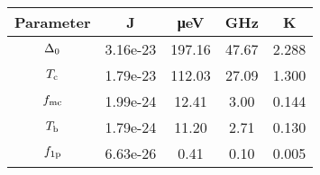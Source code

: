 \begin{tabular}{c S S S S}
\toprule
Parameter & \si{J} & \si{\micro eV} & \si{GHz} & \si{K} \\
\midrule
$\Delta_0$ & 3.16e-23 & 197.16 & 47.67 & 2.288 \\
$T_{\mathrm{c}}$ & 1.79e-23 & 112.03 & 27.09 & 1.300 \\
$f_{\mathrm{mc}}$ & 1.99e-24 & 12.41 & 3.00 & 0.144 \\
$T_{\mathrm{b}}$ & 1.79e-24 & 11.20 & 2.71 & 0.130 \\
$f_{\mathrm{1p}}$ & 6.63e-26 & 0.41 & 0.10 & 0.005 \\
\bottomrule
\end{tabular}